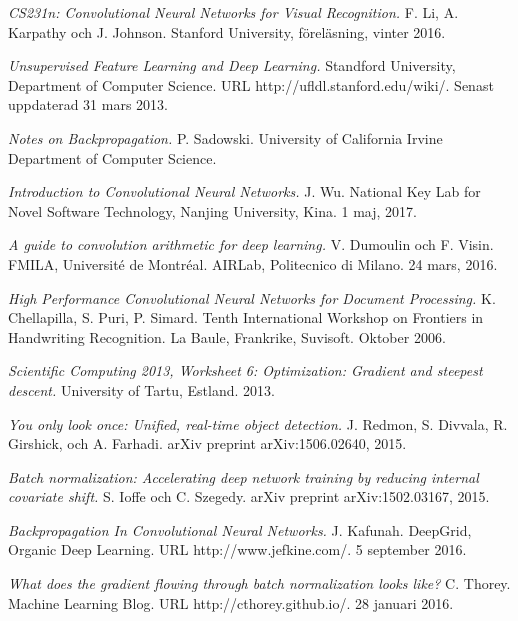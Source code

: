\documentclass[a4paper,11pt,twoside]{article}
\begin{document}
\begin{thebibliography}{99}	
	\textit{CS231n: Convolutional Neural Networks for Visual Recognition.}
    F. Li, A. Karpathy och J. Johnson.
	Stanford University, föreläsning, vinter 2016.
	
	\textit{Unsupervised Feature Learning and Deep Learning.}
    Standford University, Department of Computer Science.
    URL http://ufldl.stanford.edu/wiki/.
	Senast uppdaterad 31 mars 2013.	
	
	\textit{Notes on Backpropagation.}
    P. Sadowski.
    University of California Irvine	Department of Computer Science.
    
	\textit{Introduction to Convolutional Neural Networks.}
    J. Wu. 
    National Key Lab for Novel Software Technology, Nanjing University, Kina.
    1 maj, 2017.

	\textit{A guide to convolution arithmetic for deep learning.}
    V. Dumoulin  och F. Visin.
    FMILA, Université de Montréal. AIRLab, Politecnico di Milano.
	24 mars, 2016.

	\textit{High Performance Convolutional Neural Networks for Document Processing.}
    K. Chellapilla, S. Puri, P. Simard.
    Tenth International Workshop on Frontiers in Handwriting Recognition. 
    La Baule, Frankrike, Suvisoft.
	Oktober 2006.


	
	\textit{Scientific Computing 2013, Worksheet 6: Optimization: Gradient and steepest descent.}
    University of Tartu, Estland.
    2013.
    
	\textit{You only look once: Unified, real-time object detection.}
    J. Redmon, S. Divvala, R. Girshick, och A. Farhadi. 
    arXiv preprint arXiv:1506.02640, 2015.
    
	\textit{Batch normalization: Accelerating deep network training by reducing internal covariate shift.}
    S. Ioffe och C. Szegedy. 
	arXiv preprint arXiv:1502.03167, 2015.
    
	\textit{Backpropagation In Convolutional Neural Networks.}
	J. Kafunah.
    DeepGrid, Organic Deep Learning. 
    URL http://www.jefkine.com/.
	5 september 2016.

	\textit{What does the gradient flowing through batch normalization looks like?}
	C. Thorey.
    Machine Learning Blog. 
    URL http://cthorey.github.io/.
	28 januari 2016.
	

\end{thebibliography}
\end{document}
